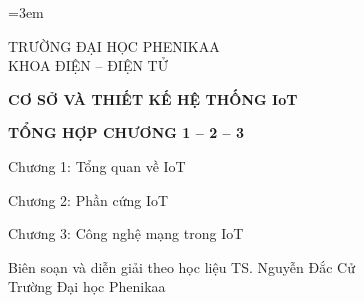 \documentclass[12pt,a4paper,oneside]{report}
\begin{document}
\emergencystretch=3em
\renewcommand{\contentsname}{Mục lục}
\renewcommand{\figurename}{Hình}
\renewcommand{\tablename}{Bảng}
\begin{titlepage}
\centering\vspace*{24mm}
{\Large TRƯỜNG ĐẠI HỌC PHENIKAA\\KHOA ĐIỆN -- ĐIỆN TỬ\par}
\vspace{25mm}
{\Huge\bfseries\color{iotblue}CƠ SỞ VÀ THIẾT KẾ HỆ THỐNG IoT\par}
\vspace{13mm}
{\LARGE\bfseries\color{iotorange}TỔNG HỢP CHƯƠNG 1 -- 2 -- 3\par}
\vspace{10mm}
{\Large Chương 1: Tổng quan về IoT\par}
{\Large Chương 2: Phần cứng IoT\par}
{\Large Chương 3: Công nghệ mạng trong IoT\par}
\vfill
{\large Biên soạn và diễn giải theo học liệu TS. Nguyễn Đắc Cử\\Trường Đại học Phenikaa\par}
\vspace{12mm}{\large 2026\par}
\end{titlepage}
\tableofcontents\clearpage
{}

\clearpage

\clearpage

\end{document}
